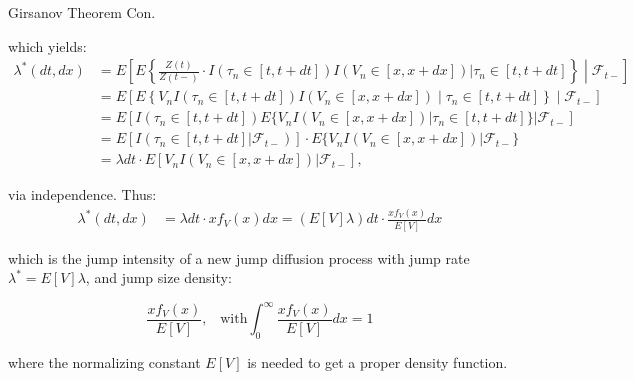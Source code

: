 \documentclass{beamer}
\begin{document}
\begin{frame}{Girsanov Theorem Con.}

    {\footnotesize \footnotesize
    \par which yields:
    \[
    \begin{aligned}
    \lambda^*(dt, dx) &= E \left[ E \left\{ \frac{Z(t)}{Z(t-)} \cdot I(\tau_n \in [t, t + dt]) I(V_n \in [x, x + dx]) | \tau_n \in [t, t + dt] \right\} \middle| \mathcal{F}_{t-} \right] \\
    &= E \left[ E \left\{ V_n I(\tau_n \in [t, t + dt]) I(V_n \in [x, x + dx]) \middle| \tau_n \in [t, t + dt] \right\} \middle| \mathcal{F}_{t-} \right] \\
    &= E \left[ I(\tau_n \in [t, t + dt]) E \{ V_n I(V_n \in [x, x + dx]) | \tau_n \in [t, t + dt] \} | \mathcal{F}_{t-} \right] \\
    &= E \left[ I(\tau_n \in [t, t + dt] | \mathcal{F}_{t-}) \right] \cdot E \{ V_n I(V_n \in [x, x + dx]) | \mathcal{F}_{t-} \} \\
    &= \lambda dt \cdot E \left[ V_n I(V_n \in [x, x + dx]) | \mathcal{F}_{t-} \right],
    \end{aligned}
    \]
    \par via independence. Thus:
    \[
    \begin{aligned}
    \lambda^*(dt, dx) &= \lambda dt \cdot x f_V(x) dx = (E [V] \lambda) dt \cdot \frac{x f_V(x)}{E [V]} dx
    \end{aligned}
    \]

which is the jump intensity of a new jump diffusion process with jump rate $\lambda^* = E [V] \lambda$, and jump size density:

\[
\frac{x f_V(x)}{E [V]}, \;\;\; \text{with} \int_{0}^{\infty} \frac{x f_V(x)}{E[V]}  dx =  1
\]

where the normalizing constant $E [V]$ is needed to get a proper density function.

    }
    
\end{frame}



    
\end{document}
